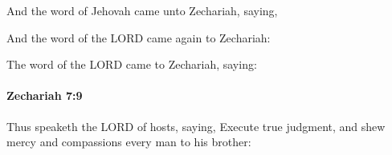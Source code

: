 			\begin{versebox}
					\item[BHS] 
					\item[LXX] 
					\item[ASV] And the word of Jehovah came unto Zechariah, saying,
					\item[NIV] And the word of the LORD came again to Zechariah:
					\item[NRSV] The word of the LORD came to Zechariah, saying:
			\end{versebox}

		\paragraph{Zechariah 7:9} %
			\label{ZECHARIAH-7-9}

			Thus speaketh the LORD of hosts, saying, Execute true judgment, and shew mercy and compassions every man to his brother:

